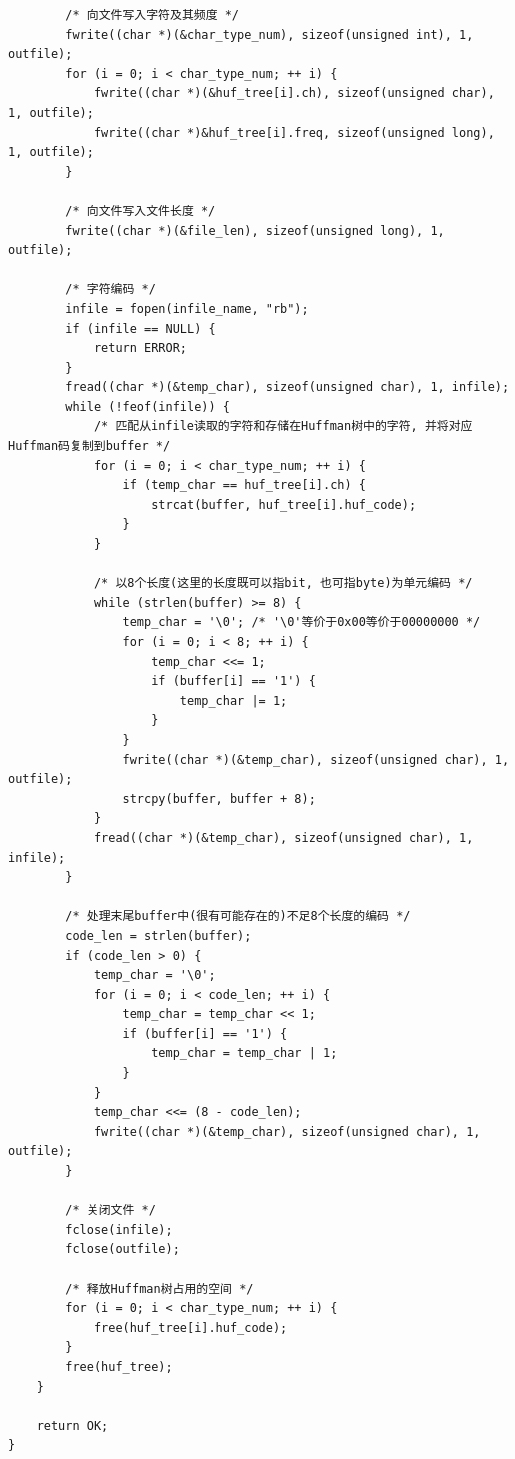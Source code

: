 \documentclass{ctexart}
\begin{document}
{\begin{lstlisting}
        /* 向文件写入字符及其频度 */
        fwrite((char *)(&char_type_num), sizeof(unsigned int), 1, outfile);
        for (i = 0; i < char_type_num; ++ i) {
            fwrite((char *)(&huf_tree[i].ch), sizeof(unsigned char), 1, outfile);
            fwrite((char *)&huf_tree[i].freq, sizeof(unsigned long), 1, outfile);
        }

        /* 向文件写入文件长度 */
        fwrite((char *)(&file_len), sizeof(unsigned long), 1, outfile);

        /* 字符编码 */
        infile = fopen(infile_name, "rb");
        if (infile == NULL) {
            return ERROR;
        }
        fread((char *)(&temp_char), sizeof(unsigned char), 1, infile);
        while (!feof(infile)) {
            /* 匹配从infile读取的字符和存储在Huffman树中的字符, 并将对应Huffman码复制到buffer */
            for (i = 0; i < char_type_num; ++ i) {
                if (temp_char == huf_tree[i].ch) {
                    strcat(buffer, huf_tree[i].huf_code);
                }
            }

            /* 以8个长度(这里的长度既可以指bit, 也可指byte)为单元编码 */
            while (strlen(buffer) >= 8) {
                temp_char = '\0'; /* '\0'等价于0x00等价于00000000 */
                for (i = 0; i < 8; ++ i) {
                    temp_char <<= 1;
                    if (buffer[i] == '1') {
                        temp_char |= 1;
                    }
                }
                fwrite((char *)(&temp_char), sizeof(unsigned char), 1, outfile);
                strcpy(buffer, buffer + 8);
            }
            fread((char *)(&temp_char), sizeof(unsigned char), 1, infile);
        }
        
        /* 处理末尾buffer中(很有可能存在的)不足8个长度的编码 */
        code_len = strlen(buffer);
        if (code_len > 0) {
            temp_char = '\0';
            for (i = 0; i < code_len; ++ i) {
                temp_char = temp_char << 1;
                if (buffer[i] == '1') {
                    temp_char = temp_char | 1;
                }
            }
            temp_char <<= (8 - code_len);
            fwrite((char *)(&temp_char), sizeof(unsigned char), 1, outfile);
        }

        /* 关闭文件 */
        fclose(infile);
        fclose(outfile);

        /* 释放Huffman树占用的空间 */
        for (i = 0; i < char_type_num; ++ i) {
            free(huf_tree[i].huf_code);
        }
        free(huf_tree);
    }

    return OK;
}
\end{lstlisting}}
\end{document}
